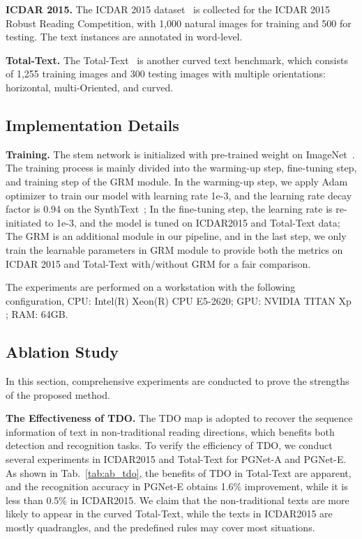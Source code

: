\documentclass[letterpaper]{article} \usepackage{aaai21}  \usepackage{times}  \usepackage{helvet} \usepackage{courier}  \usepackage[hyphens]{url}  \usepackage{graphicx} \urlstyle{rm} \def\UrlFont{\rm}  \usepackage{natbib}  \usepackage{caption} \usepackage{bm}
\begin{document}
\textbf{ICDAR 2015.} The ICDAR 2015 dataset~\cite{karatzas2015icdar} is collected for the ICDAR 2015 Robust Reading Competition, with 1,000 natural images for training and 500 for testing. The text instances are annotated in word-level.

\textbf{Total-Text.} The Total-Text~\cite{ch2017total} is another curved text benchmark, which consists of 1,255 training images and 300 testing images with multiple orientations: horizontal, multi-Oriented, and curved. 


\subsection{Implementation Details}
\textbf{Training.} The stem network is initialized with pre-trained weight on ImageNet~\cite{deng2009imagenet}. The training process is mainly divided into the warming-up step, fine-tuning step, and training step of the GRM module. In the warming-up step, we apply Adam optimizer to train our model with learning rate 1e-3, and the learning rate decay factor is 0.94 on the SynthText~\cite{gupta2016synthetic}; In the fine-tuning step, the learning rate is re-initiated to 1e-3, and the model is tuned on ICDAR2015 and Total-Text data; The GRM is an additional module in our pipeline, and in the last step, we only train the learnable parameters in GRM module to provide both the metrics on ICDAR 2015 and Total-Text with/without GRM for a fair comparison.

The experiments are performed on a workstation with the following configuration, CPU: Intel(R) Xeon(R) CPU E5-2620; GPU: NVIDIA TITAN Xp ; RAM: 64GB. 

\subsection{Ablation Study}
In this section, comprehensive experiments are conducted to prove the strengths of the proposed method.

\textbf{The Effectiveness of TDO.} The TDO map is adopted to recover the sequence information of text in non-traditional reading directions, which benefits both detection and recognition tasks. To verify the efficiency of TDO, we conduct several experiments in ICDAR2015 and Total-Text for PGNet-A and PGNet-E. As shown in Tab.~\ref{tab:ab_tdo}, the benefits of TDO in Total-Text are apparent, and the recognition accuracy in PGNet-E obtains 1.6\% improvement, while it is less than 0.5\% in ICDAR2015. We claim that the non-traditional texts are more likely to appear in the curved Total-Text, while the texts in ICDAR2015 are mostly quadrangles, and the predefined rules may cover most situations.
\end{document}
